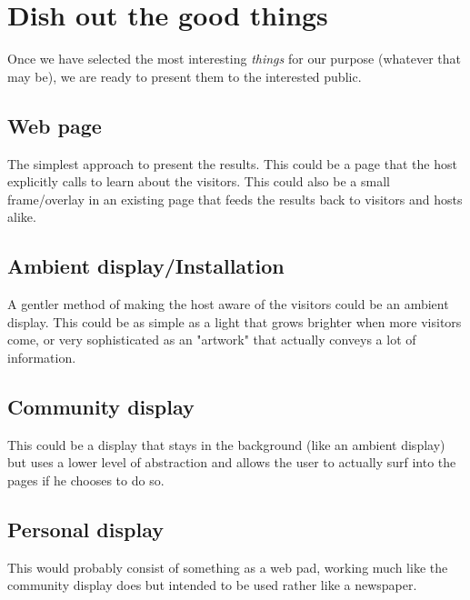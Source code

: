 \documentclass[a4paper]{danarticle}
\begin{document}
  \section*{Dish out the good things}
    Once we have selected the most interesting \textit{things} for our 
    purpose (whatever
    that may be), we are ready to present them to the interested public.
    \subsection*{Web page}
      The simplest approach to present the results. This could be a page that
      the host explicitly calls to learn about the visitors. This could also be
      a small frame/overlay in an existing page that feeds the results back to
      visitors and hosts alike.
    \subsection*{Ambient display/Installation}
      A gentler method of making the host aware of the visitors could be an
      ambient display. This could be as simple as a light that grows brighter
      when more visitors come, or very sophisticated as an "artwork" that
      actually conveys a lot of information.
    \subsection*{Community display}
      This could be a display that stays in the background (like an ambient
      display) but uses a lower level of abstraction and allows the user to
      actually surf into the pages if he chooses to do so.
    \subsection*{Personal display}
      This would probably consist of something as a web pad, working much like
      the community display does but intended to be used rather like a
      newspaper.
\end{document}
